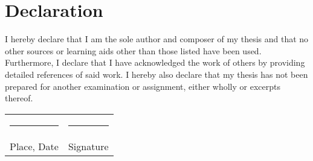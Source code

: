 \chapter*{Declaration}
I hereby declare that I am the sole author and composer of my thesis and that no other sources or learning aids other than those listed have been used. Furthermore, I declare that I have acknowledged the work of others by providing detailed references of said work.  \newline
I hereby also declare that my thesis has not been prepared for another examination
or assignment, either wholly or excerpts thereof.
\\[3\normalbaselineskip]
\begin{tabular}{p{} l}
  \rule{\textwidth/3}{0.4pt}   &   \rule{\textwidth/3}{0.4pt} \\
  Place, Date                  &   Signature
\end{tabular}
